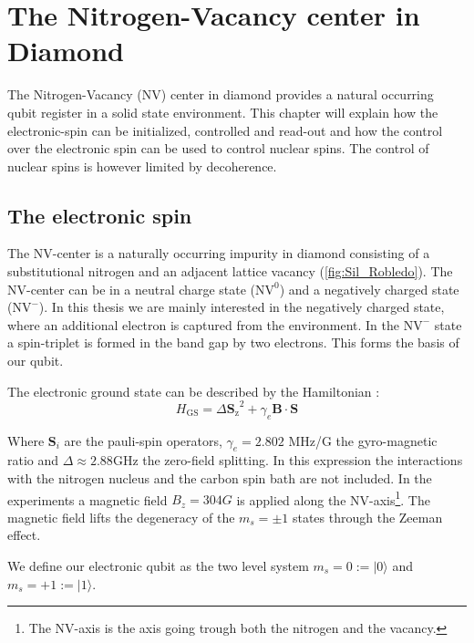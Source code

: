 \chapter{The Nitrogen-Vacancy center in Diamond}
The Nitrogen-Vacancy (NV) center in diamond provides a natural occurring qubit register in a solid state environment.
This chapter will explain how the electronic-spin can be initialized, controlled and read-out and how the control over the electronic spin can be used to control nuclear spins.
The control of nuclear spins is however limited by decoherence.

\section{The electronic spin}
The NV-center is a naturally occurring impurity in diamond consisting of a substitutional nitrogen and an adjacent lattice vacancy (\cref{fig:Sil_Robledo}). %
The NV-center can be in a neutral charge state ($\mathrm{NV}^0$) and a negatively charged state ($\mathrm{NV}^-$).
In this thesis we are mainly interested in the negatively charged state, where an additional electron is captured from the environment.
In the $\mathrm{NV}^-$ state a spin-triplet is formed in the band gap by two electrons.
This forms the basis of our qubit.

The electronic ground state can be described by the Hamiltonian \citep{Bernien2014Control}:
 \begin{equation}
H_\mathrm{GS} = \Delta {\bm{S}_\mathrm{z}}^2 + \gamma_e \bm{B} \cdot \bm{S}
\end{equation}

Where $\bm{S}_i$ are the pauli-spin operators,  $\gamma_e  = 2.802$ MHz/G  the gyro-magnetic ratio and $\Delta \approx 2.88 \mathrm{GHz}$ the zero-field splitting.
In this expression the interactions with the nitrogen nucleus and the carbon spin bath are not included.
In the experiments a magnetic field $B_z = 304G$ is applied along the NV-axis\footnote{The NV-axis is the axis going trough both the nitrogen and the vacancy. }.
The magnetic field lifts the degeneracy of the $m_s = \pm 1$ states through the Zeeman effect.

We define our electronic qubit  as the two level system  $m_s=0:=|0\rangle$ and $m_s = +1 := |1\rangle$.

